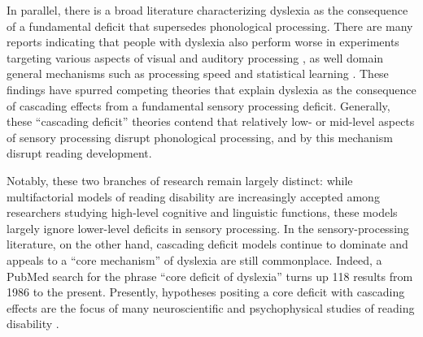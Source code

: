 \documentclass[../uwthesis.tex]{subfiles}
\begin{document}
In parallel, there is a broad literature characterizing dyslexia as the consequence of a fundamental deficit that supersedes phonological processing. There are many reports indicating that people with dyslexia also perform worse in experiments targeting various aspects of visual \citep{Stuart2006,Talcott2002}
and auditory processing \citep{Hamalainen2013,Noordenbos2015}, as well domain general mechanisms such as processing speed and statistical learning \citep{Gabay2015,Vandermosten2018StatisticalChildren}. These findings have spurred competing theories that explain dyslexia as the consequence of cascading effects from a fundamental sensory processing deficit. Generally, these “cascading deficit” theories contend that relatively low- or mid-level aspects of sensory processing disrupt phonological processing, and by this mechanism disrupt reading development.

Notably, these two branches of research remain largely distinct: while multifactorial models of reading disability are increasingly accepted among researchers studying high-level cognitive and linguistic functions, these models largely ignore lower-level deficits in sensory processing. In the sensory-processing literature, on the other hand, cascading deficit models continue to dominate and appeals to a “core mechanism” of dyslexia are still commonplace. Indeed, a PubMed search for the phrase “core deficit of dyslexia” turns up 118 results from 1986 to the present. Presently, hypotheses positing a core deficit with cascading effects are the focus of many neuroscientific and psychophysical studies of reading disability \citep{Casini2018ItsDyslexia,Colling2017NeuralStudy,Frey2019BehavioralDyslexia,Frey2019MusicStudy,Gori2016MultipleDyslexia,Krause2015PayDyslexia,Lieder2019PerceptualDyslexia,Nicolson2018ProceduralCommitment,Vidyasagar2019VisualRemediation}.
\end{document}

